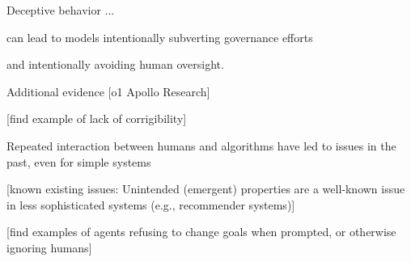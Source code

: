 \documentclass{article}
\theoremstyle{plain}
\theoremstyle{definition}
\theoremstyle{remark}
\begin{document}
Deceptive behavior ...

can lead to models intentionally subverting governance efforts

and intentionally avoiding human oversight.

Additional evidence [o1 Apollo Research]



[find example of lack of corrigibility]
 

Repeated interaction between humans and algorithms have led to issues in the past, even for simple systems

[known existing issues: Unintended (emergent) properties are a well-known issue in less sophisticated systems (e.g., recommender systems)]

[find examples of agents refusing to change goals when prompted, or otherwise ignoring humans]
\fi




\end{document}
